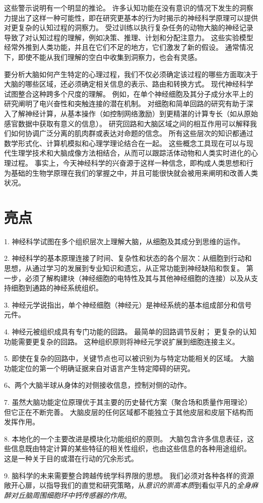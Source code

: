 这些警示说明有一个明显的推论。
许多认知功能在没有意识的情况下发生的洞察力提出了这样一种可能性，即在研究更基本的行为时揭示的神经科学原理可以提供对更复杂的认知过程的洞察力。
受过训练以执行复杂任务的动物大脑的神经记录导致了对认知过程的理解，例如决策、推理、计划和分配注意力。 
这些实验模型经常外推到人类功能，并且在它们不足的地方，它们激发了新的假设。
通常情况下，即使不能从我们理解的空白中收集到洞察力，也会有灵感。


要分析大脑如何产生特定的心理过程，我们不仅必须确定该过程的哪些方面取决于大脑的哪些区域，还必须确定相关信息的表示、路由和转换方式。
现代神经科学试图整合这种跨多个尺度的理解。
例如，在单个神经细胞及其分子成分水平上的研究阐明了电兴奋性和突触连接的潜在机制。
对细胞和简单回路的研究有助于深入了解神经计算，从基本操作（如控制网络激励）到更精湛的计算专长（如从原始感官数据中获取有意义的信息）。
研究回路和大脑区域之间的相互作用可以解释我们如何协调广泛分离的肌肉群或表达对命题的信念。
所有这些层次的知识都通过数学形式化、计算机模拟和心理学理论结合在一起。
这些概念工具现在可以与现代生理学技术和大脑成像方法相结合，从而可以跟踪活体动物和人类实时进化的心理过程。
事实上，今天神经科学的兴奋源于这样一种信念，即构成人类思想和行为基础的生物学原理在我们的掌握之中，并且可能很快就会被用来阐明和改善人类状况。




\section{亮点}

1. 神经科学试图在多个组织层次上理解大脑，从细胞及其成分到思维的运作。


2. 神经科学的基本原理连接了时间、复杂性和状态的各个层次：从细胞到行动和思想，从通过学习的发展到专业知识和遗忘，从正常功能到神经缺陷和恢复。
第一步，必须了解构建块（神经细胞的电特性及其与其他神经细胞的连接）以及从支持细胞到通路的神经系统组织。


3. 神经元学说指出，单个神经细胞（神经元）是神经系统的基本组成部分和信号元件。


4. 神经元被组织成具有专门功能的回路。
最简单的回路调节反射；
更复杂的认知功能需要更复杂的回路。
这种组织原则将神经元学说扩展到细胞连接主义。


5. 即使在复杂的回路中，关键节点也可以被识别为与特定功能相关的区域。
大脑功能定位的第一个明确证据来自对语言产生特定障碍的研究。


6、两个大脑半球从身体的对侧接收信息，控制对侧的动作。


7. 虽然大脑功能定位原理优于其主要的历史替代方案（聚合场和质量作用理论）但它正在不断完善。
大脑皮层的任何区域都不能独立于其他皮层和皮层下结构而发挥作用。


8. 本地化的一个主要改进是模块化功能组织的原则。
大脑包含许多信息表征，这些信息既由特定计算的某些特征的相关性组织，也由这些信息的各种用途组织。
这是一种关于目的或潜在行动的冗余形式。


9. 脑科学的未来需要整合跨越传统学科界限的思想。
我们必须对各种各样的资源敞开心扉，以指导我们的直觉和研究策略，从\textit{意识的崇高本质}到看似平凡的\textit{全身麻醉对丘脑周围细胞环中钙传感器的作用}。


